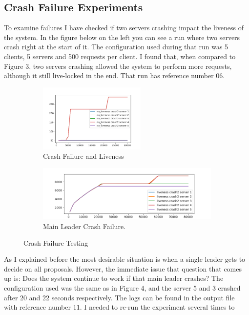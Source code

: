 \documentclass[11pt]{article}
\begin{document}
\subsection*{Crash Failure Experiments}
To examine failures I have checked if two servers crashing
impact the liveness of the system. In the figure below on the left you can see a run
where two servers crash right at the start of it. The configuration used during that
run was 5 clients, 5 servers and 500 requests per client. I found that, when compared
to Figure 3, two servers crashing allowed the system to perform more requests, although
it still live-locked in the end. That run has reference number 06.
\begin{figure}[H]
          \begin{subfigure}[b]{0.35\textwidth}
      \centering
      \includegraphics[width=200px]{crash2.png}
      \caption{Crash Failure and Liveness}
    \end{subfigure}%
\begin{subfigure}[b]{0.65\textwidth}
      \centering
      \includegraphics[width=400px]{crash2_liveness.png}
      \caption{Main Leader Crash Failure.}
    \end{subfigure}

    \centering
      \caption{Crash Failure Testing}
    \vspace{-15pt}
\end{figure}
As I explained before the most desirable situation is when a single leader gets
to decide on all proposals. However, the immediate issue that question that
comes up is: Does the system continue to work if that main leader crashes? The
configuration used was the same as in Figure 4, and the server 5 and 3 crashed
after 20 and 22 seconds respectively. The logs can be found in the output file
with reference number 11. I needed to re-run the experiment several times to
\end{document}

